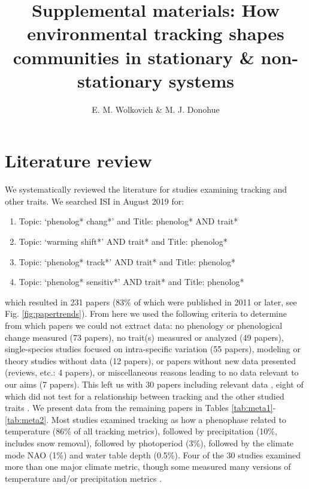 \documentclass[11pt,letter]{article}
\begin{document}
\renewcommand{\refname}{\CHead{}}

\title{Supplemental materials:  How environmental tracking shapes communities in stationary \& non-stationary systems} 

\author{E. M. Wolkovich \& M. J. Donohue}
\date{} 
\maketitle  %
\renewcommand{\thetable}{S\arabic{table}}
\renewcommand{\thefigure}{S\arabic{figure}}

\section{Literature review}
We systematically reviewed the literature for studies examining tracking and other traits. We searched ISI in August 2019 for:
\begin{enumerate}
\item Topic: `phenolog* chang*' and Title: phenolog* AND trait*
\item Topic: `warming shift*' AND trait* and Title: phenolog*
\item Topic: `phenolog* track*' AND trait* and Title: phenolog*
\item Topic: `phenolog* sensitiv*' AND trait* and Title: phenolog*
\end{enumerate}
which resulted in 231 papers (83\% of which were published in 2011 or later, see Fig. \ref{fig:papertrends}). From here we used the following criteria to determine from which papers we could not extract data: no phenology or phenological change measured (73 papers), no trait(s) measured or analyzed (49 papers), single-species studies focused on intra-specific variation (55 papers), modeling or theory studies without data (12 papers), or papers without new data presented (reviews, etc.: 4 papers), or miscellaneous reasons leading to no data relevant to our aims (7 papers). This left us with 30 papers including relevant data \citep{Suzuki:1997gf,Post1999,adrian2006,Xu:2009an,Goodenough2010,Diamond:2011nx,Moussus2011,Szilvia2012,Dorji2013,Ishioka2013,xia2013,Bock2014,kharouba2014,Vegvari2015,bell2015,jing2016,lasky2016,McDermott2016,Zhu2016BioLetters,brooks2017,du2017,munson2017,arfinkhan2018,zhang2018,Ladwig2019,park2019,sharma2019,Xavier2019,Zettlemoyer2019}, eight of which did not test for a relationship between tracking and the other studied traits \citep{Suzuki:1997gf,adrian2006,Xu:2009an,bell2015,McDermott2016,Sherwood2017,sharma2019,Xavier2019}. We present data from the remaining papers in Tables \ref{tab:meta1}-\ref{tab:meta2}. Most studies examined tracking as how a phenophase related to temperature (86\% of all tracking metrics), followed by precipitation (10\%, includes snow removal), followed by photoperiod (3\%), followed by the climate mode NAO (1\%) and water table depth (0.5\%). Four of the 30 studies examined more than one major climate metric, though some measured many versions of temperature and/or precipitation metrics \citep[e.g., 15 precipitation and/or temperature metrics considered in][]{munson2017}.
\end{document}
